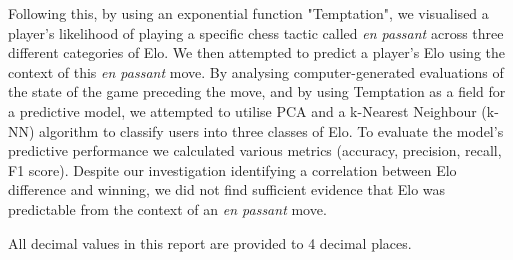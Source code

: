 \documentclass[10pt,a4paper]{article}
\begin{document}
Following this, by using an exponential function "Temptation", we visualised a player's likelihood of playing a specific chess tactic called \textit{en passant} across three different categories of Elo. We then attempted to predict a player's Elo using the context of this \textit{en passant} move. By analysing computer-generated evaluations of the state of the game preceding the move, and by using Temptation as a field for a predictive model, we attempted to utilise PCA and a k-Nearest Neighbour (k-NN) algorithm to classify users into three classes of Elo. To evaluate the model's predictive performance we calculated various metrics (accuracy, precision, recall, F1 score). Despite our investigation identifying a correlation between Elo difference and winning, we did not find sufficient evidence that Elo was predictable from the context of an \textit{en passant} move. \newline

All decimal values in this report are provided to 4 decimal places.
\end{document}
